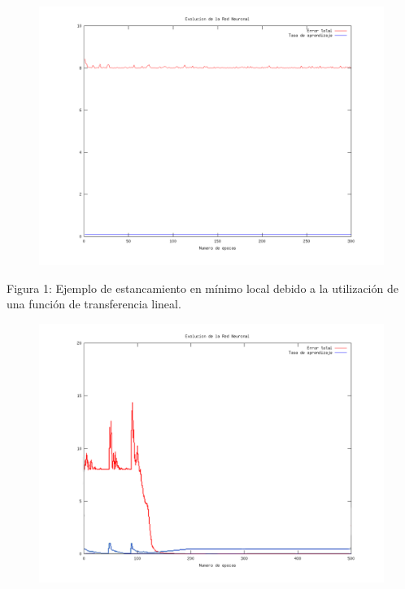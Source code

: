 \documentclass[%
    final,
    reprint,
    notitlepage,
    narroweqnarray,
    inline,
    twoside,
    invited
    ]{ieee}
\begin{document}
\begin{figure}[H]
\begin{center}
\includegraphics[scale=0.30]{./images/LinearConstante.png}
\label{modelado}
\end{center}
\end{figure}

\begin{center}
\par Figura 1: Ejemplo de estancamiento en mínimo local debido a la utilización de una función de transferencia lineal.
\end{center}

\begin{figure}[H]
\begin{center}
\includegraphics[scale=0.30]{./images/escapeminlocal.png}
\label{modelado}
\end{center}
\end{figure}
\end{document}
